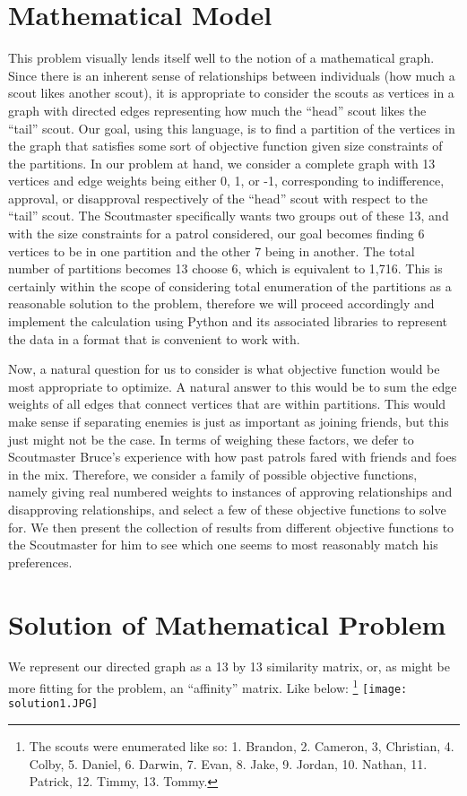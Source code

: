 \documentclass{amsart}
\theoremstyle{definition}
\theoremstyle{remark}
\numberwithin{equation}{section}
\begin{document}
\section*{Mathematical Model}
This problem visually lends itself well to the notion of a mathematical graph. Since there is an inherent sense of relationships between individuals (how much a scout likes another scout), it is appropriate to consider the scouts as vertices in a graph with directed edges representing how much the “head” scout likes the “tail” scout. Our goal, using this language, is to find a partition of the vertices in the graph that satisfies some sort of objective function given size constraints of the partitions. In our problem at hand, we consider a complete graph with 13 vertices and edge weights being either 0, 1, or -1, corresponding to indifference, approval, or disapproval respectively of the “head” scout with respect to the “tail” scout. The Scoutmaster specifically wants two groups out of these 13, and with the size constraints for a patrol considered, our goal becomes finding 6 vertices to be in one partition and the other 7 being in another. The total number of partitions becomes 13 choose 6, which is equivalent to 1,716. This is certainly within the scope of considering total enumeration of the partitions as a reasonable solution to the problem, therefore we will proceed accordingly and implement the calculation using Python and its associated libraries to represent the data in a format that is convenient to work with.

Now, a natural question for us to consider is what objective function would be most appropriate to optimize. A natural answer to this would be to sum the edge weights of all edges that connect vertices that are within partitions. This would make sense if separating enemies is just as important as joining friends, but this just might not be the case. In terms of weighing these factors, we defer to Scoutmaster Bruce’s experience with how past patrols fared with friends and foes in the mix. Therefore, we consider a family of possible objective functions, namely giving real numbered weights to instances of approving relationships and disapproving relationships, and select a few of these objective functions to solve for. We then present the collection of results from different objective functions to the Scoutmaster for him to see which one seems to most reasonably match his preferences.
\section*{Solution of Mathematical Problem}
We represent our directed graph as a 13 by 13 similarity matrix, or, as might be more fitting for the problem, an “affinity” matrix. Like below:%
\footnote{The scouts were enumerated like so: 1. Brandon, 2. Cameron, 3, Christian, 4. Colby, 5. Daniel, 6. Darwin, 7. Evan, 8. Jake, 9. Jordan, 10. Nathan, 11. Patrick, 12. Timmy, 13. Tommy.}%
\texttt{[image: solution1.JPG]}
\end{document}

